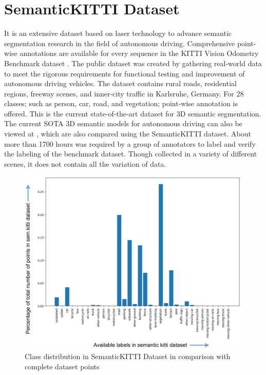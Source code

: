 \section{SemanticKITTI Dataset}
It is an extensive dataset based on laser technology to advance semantic segmentation research in the field of autonomous driving. Comprehensive point-wise annotations are available for every sequence in the KITTI Vision Odometry Benchmark dataset \parencite{Geiger2012CVPR}. The public dataset was created by gathering real-world data to meet the rigorous requirements for functional testing and improvement of autonomous driving vehicles. The dataset contains rural roads, residential regions, freeway scenes, and inner-city traffic in Karlsruhe, Germany. For 28 classes; such as person, car, road, and vegetation; point-wise annotation is offered. This is the current state-of-the-art dataset for 3D semantic segmentation. The current SOTA 3D semantic models for autonomous driving can also be viewed at \parencite{papers-with-code}, which are also compared using the SemanticKITTI dataset. About more than 1700 hours \parencite{behley2019semantickitti} was required by a group of annotators to label and verify the labeling of the benchmark dataset. Though collected in a variety of different scenes, it does not contain all the variation of data.

\begin{figure}[htb]
    \centering
    \includegraphics[width=1\linewidth]{97_graphics//related_work/ratio_with_total_points_kitti.pdf}
    \caption{Class distribution in SemanticKITTI Dataset in comparison with complete dataset points}
    \label{fig:related_work-ratio_with_total_points_kitti}
\end{figure}

